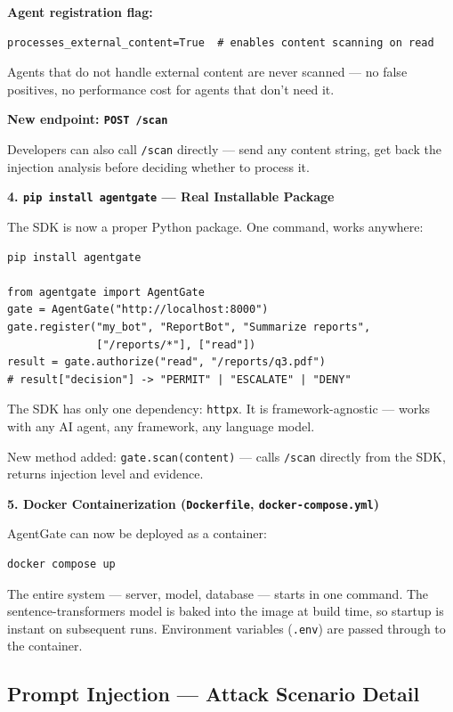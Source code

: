 \documentclass[12pt, a4paper]{article}
\begin{document}
\textbf{Agent registration flag:}
\begin{verbatim}
processes_external_content=True  # enables content scanning on read
\end{verbatim}

Agents that do not handle external content are never scanned — no false
positives, no performance cost for agents that don't need it.

\textbf{New endpoint: \texttt{POST /scan}}

Developers can also call \texttt{/scan} directly — send any content string,
get back the injection analysis before deciding whether to process it.

\textbf{4. \texttt{pip install agentgate} — Real Installable Package}

The SDK is now a proper Python package. One command, works anywhere:

\begin{verbatim}
pip install agentgate

from agentgate import AgentGate
gate = AgentGate("http://localhost:8000")
gate.register("my_bot", "ReportBot", "Summarize reports",
              ["/reports/*"], ["read"])
result = gate.authorize("read", "/reports/q3.pdf")
# result["decision"] -> "PERMIT" | "ESCALATE" | "DENY"
\end{verbatim}

The SDK has only one dependency: \texttt{httpx}. It is framework-agnostic —
works with any AI agent, any framework, any language model.

New method added: \texttt{gate.scan(content)} — calls \texttt{/scan} directly
from the SDK, returns injection level and evidence.

\textbf{5. Docker Containerization (\texttt{Dockerfile}, \texttt{docker-compose.yml})}

AgentGate can now be deployed as a container:
\begin{verbatim}
docker compose up
\end{verbatim}

The entire system — server, model, database — starts in one command.
The sentence-transformers model is baked into the image at build time,
so startup is instant on subsequent runs. Environment variables (\texttt{.env})
are passed through to the container.

\subsection{Prompt Injection — Attack Scenario Detail}
\end{document}
